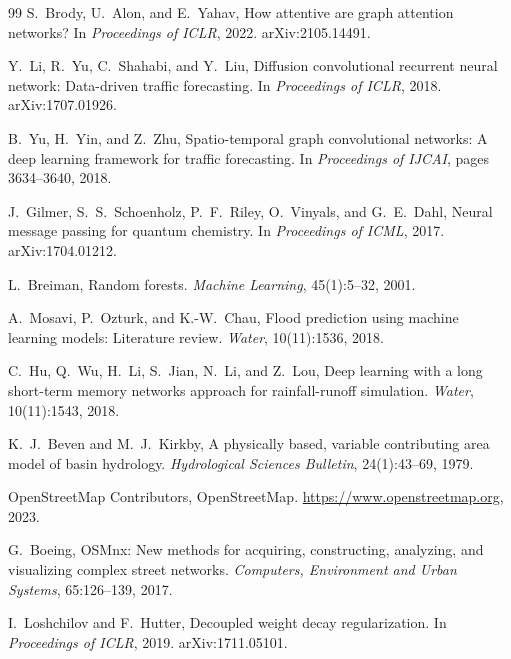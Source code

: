 \documentclass[10pt,twocolumn]{article}
\begin{document}
\begin{thebibliography}{99}
S.~Brody, U.~Alon, and E.~Yahav,
\newblock How attentive are graph attention networks?
\newblock In \emph{Proceedings of ICLR}, 2022.
\newblock arXiv:2105.14491.

Y.~Li, R.~Yu, C.~Shahabi, and Y.~Liu,
\newblock Diffusion convolutional recurrent neural network: Data-driven traffic
  forecasting.
\newblock In \emph{Proceedings of ICLR}, 2018.
\newblock arXiv:1707.01926.

B.~Yu, H.~Yin, and Z.~Zhu,
\newblock Spatio-temporal graph convolutional networks: A deep learning
  framework for traffic forecasting.
\newblock In \emph{Proceedings of IJCAI}, pages 3634--3640, 2018.
\newblock {}

J.~Gilmer, S.~S.~Schoenholz, P.~F.~Riley, O.~Vinyals, and G.~E.~Dahl,
\newblock Neural message passing for quantum chemistry.
\newblock In \emph{Proceedings of ICML}, 2017.
\newblock arXiv:1704.01212.

L.~Breiman,
\newblock Random forests.
\newblock \emph{Machine Learning}, 45(1):5--32, 2001.
\newblock {}

A.~Mosavi, P.~Ozturk, and K.-W.~Chau,
\newblock Flood prediction using machine learning models: Literature review.
\newblock \emph{Water}, 10(11):1536, 2018.
\newblock {}

C.~Hu, Q.~Wu, H.~Li, S.~Jian, N.~Li, and Z.~Lou,
\newblock Deep learning with a long short-term memory networks approach for
  rainfall-runoff simulation.
\newblock \emph{Water}, 10(11):1543, 2018.
\newblock {}

K.~J.~Beven and M.~J.~Kirkby,
\newblock A physically based, variable contributing area model of basin
  hydrology.
\newblock \emph{Hydrological Sciences Bulletin}, 24(1):43--69, 1979.
\newblock {}

OpenStreetMap Contributors,
\newblock OpenStreetMap.
\newblock \url{https://www.openstreetmap.org}, 2023.

G.~Boeing,
\newblock OSMnx: New methods for acquiring, constructing, analyzing, and
  visualizing complex street networks.
\newblock \emph{Computers, Environment and Urban Systems}, 65:126--139, 2017.
\newblock {}

I.~Loshchilov and F.~Hutter,
\newblock Decoupled weight decay regularization.
\newblock In \emph{Proceedings of ICLR}, 2019.
\newblock arXiv:1711.05101.


\end{thebibliography}
\end{document}
